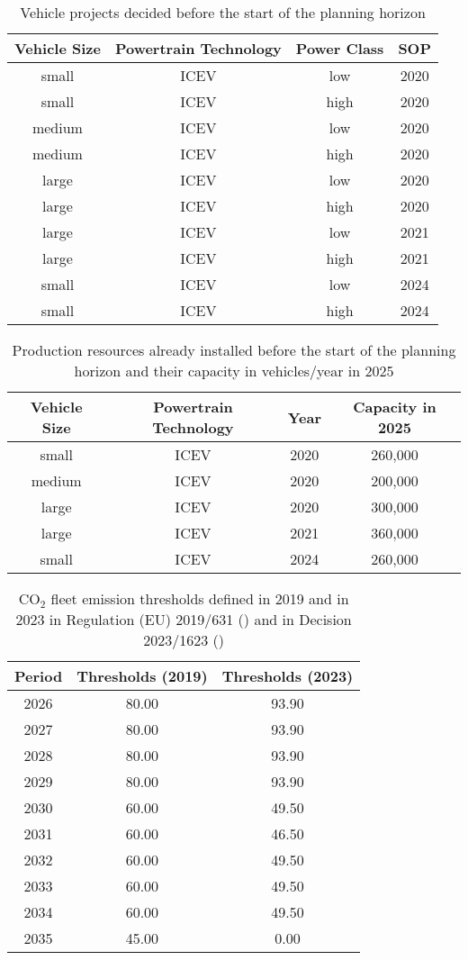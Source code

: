 \begin{table}[h]
\centering
\begin{tabular}{cccc}
\toprule
Vehicle Size&Powertrain Technology&Power Class&\gls{SOP} \\
\midrule
small&ICEV&low&2020 \\
small&ICEV&high&2020\\
medium&ICEV&low&2020\\
medium&ICEV&high&2020\\
large&ICEV&low&2020\\
large&ICEV&high&2020\\
large&ICEV&low&2021\\
large&ICEV&high&2021\\
small&ICEV&low&2024\\
small&ICEV&high&2024\\
\bottomrule
\end{tabular}
\caption{Vehicle projects decided before the start of the planning horizon}\label{tab:projectsbefore2026}
\end{table}
\begin{table}[h]
\centering
\begin{tabular}{ccc|c}
\toprule
Vehicle Size&Powertrain Technology&Year&Capacity in 2025\\
\midrule
small&ICEV&2020&260,000\\
medium&ICEV&2020&200,000\\
large&ICEV&2020&300,000\\
large&ICEV&2021&360,000\\
small&ICEV&2024&260,000\\
\bottomrule
\end{tabular}
\caption{Production resources already installed before the start of the planning horizon and their capacity in vehicles/year in 2025}\label{tab:resourcesbefore2026}
\end{table}
\begin{table}[h]
\centering
\begin{tabular}{c|cc}
\toprule
Period &Thresholds (2019)&Thresholds (2023)\\
\midrule
2026&80.00& 93.90 \\
2027&80.00&93.90\\
2028&80.00&93.90\\
2029&80.00&93.90\\
2030&60.00&49.50\\
2031&60.00&46.50\\
2032&60.00&49.50\\
2033&60.00&49.50\\
2034&60.00&49.50\\
2035&45.00&0.00\\
\bottomrule
\end{tabular}
\caption{$\text{CO}_{2}$ fleet emission thresholds defined in 2019 and in 2023 in Regulation (EU) 2019/631 (\cite{european2019regulation}) and in Decision 2023/1623 (\cite{european2023newregulation})}\label{tab:setsofthresholds}
\end{table}
